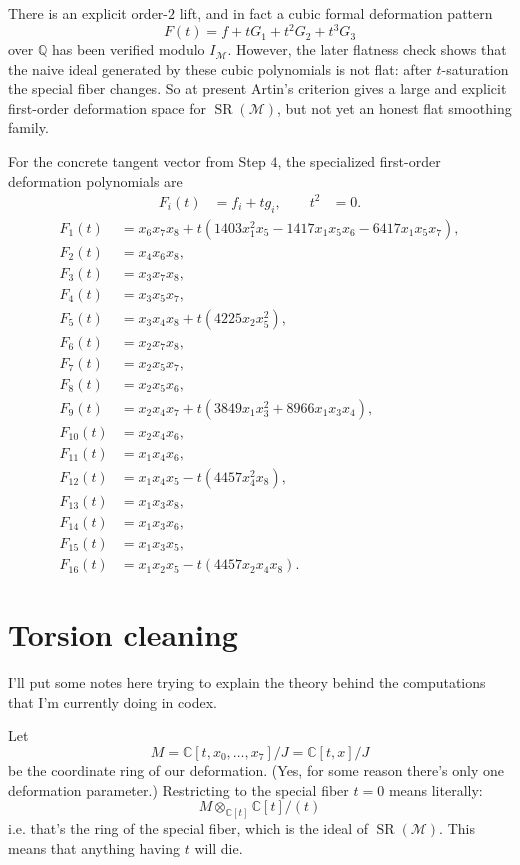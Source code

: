 \medskip\noindent
There is an explicit order-$2$ lift, and in fact a cubic
formal deformation pattern
$$
F(t)=f+tG_1+t^2G_2+t^3G_3
$$
over $\mathbb{Q}$ has been verified modulo $I_{\mathcal{M}}$.
However, the later flatness check shows that the naive
ideal generated by these cubic polynomials is not flat:
after $t$-saturation the special fiber changes.
So at present Artin's criterion gives a large and explicit
first-order deformation space for $\operatorname{SR}(\mathcal{M})$,
but not yet an honest flat smoothing family.

\medskip\noindent
For the concrete tangent vector from
Step $4$, the specialized
first-order deformation polynomials are
$$
\begin{aligned}
F_i(t)&=f_i+t g_i,\qquad t^2&=0.
\end{aligned}
$$
\begingroup\footnotesize
$$
\begin{aligned}
F_1(t)&=x_6x_7x_8+t(1403x_1^2x_5
-1417x_1x_5x_6
-6417x_1x_5x_7),\\
F_2(t)&=x_4x_6x_8,\\
F_3(t)&=x_3x_7x_8,\\
F_4(t)&=x_3x_5x_7,\\
F_5(t)&=x_3x_4x_8
+t(4225x_2x_5^2),\\
F_6(t)&=x_2x_7x_8,\\
F_7(t)&=x_2x_5x_7,\\
F_8(t)&=x_2x_5x_6,\\
F_9(t)&=x_2x_4x_7
+t(3849x_1x_3^2
+8966x_1x_3x_4),\\
F_{10}(t)&=x_2x_4x_6,\\
F_{11}(t)&=x_1x_4x_6,\\
F_{12}(t)&=x_1x_4x_5
-t(4457x_4^2x_8),\\
F_{13}(t)&=x_1x_3x_8,\\
F_{14}(t)&=x_1x_3x_6,\\
F_{15}(t)&=x_1x_3x_5,\\
F_{16}(t)&=x_1x_2x_5
-t(4457x_2x_4x_8).
\end{aligned}
$$
\endgroup

\section{Torsion cleaning}
\label{section-torsion-cleaning}

\noindent
I'll put some notes here trying to explain
the theory behind the computations that
I'm currently doing in codex.

\medskip\noindent
Let
$$
M=\mathbb{C}[t,x_0,…,x_7]/J
=\mathbb{C}[t,x]/J
$$
be the coordinate ring of our deformation.
(Yes, for some reason there's only one
deformation parameter.)
Restricting to the special fiber
$t=0$ means literally:
$$
M \otimes_{\mathbb{C}[t]}
\mathbb{C}[t]/(t)
$$
i.e. that's the ring of the special fiber,
which is the ideal of 
$\operatorname{SR}(\mathcal{M})$.
This means that anything having $t$ will die.

